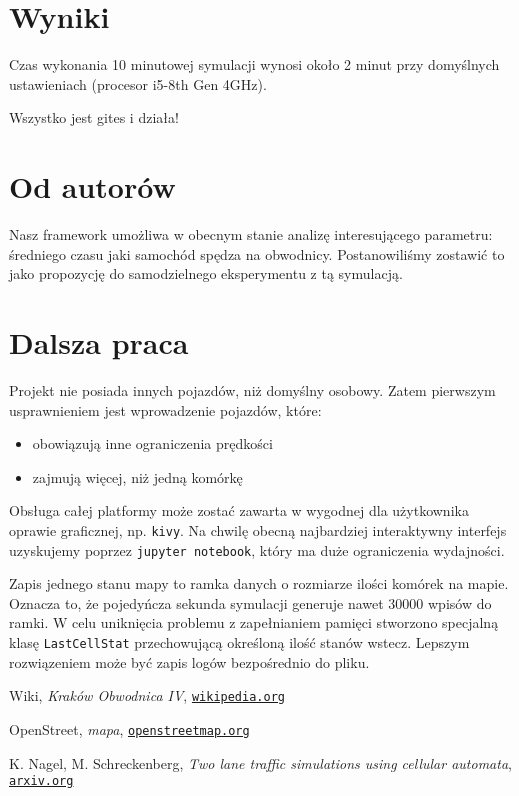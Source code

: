 \documentclass[a4paper,12pt]{article}
\begin{document}
    \section{Wyniki}
    Czas wykonania 10 minutowej symulacji wynosi około 2 minut przy domyślnych ustawieniach (procesor i5-8th Gen 4GHz).
    
	Wszystko jest gites i działa!
		
    \section{Od autorów}
    Nasz framework umożliwa w obecnym stanie analizę interesującego parametru: średniego czasu jaki samochód spędza na obwodnicy. Postanowiliśmy zostawić to jako propozycję do samodzielnego eksperymentu z tą symulacją.

    \section{Dalsza praca}
    Projekt nie posiada innych pojazdów, niż domyślny osobowy. Zatem pierwszym usprawnieniem jest wprowadzenie pojazdów, które: 
    
    \begin{itemize}
    	\item obowiązują inne ograniczenia prędkości
    	\item zajmują więcej, niż jedną komórkę
    \end{itemize}

	Obsługa całej platformy może zostać zawarta w wygodnej dla użytkownika oprawie graficznej, np. \texttt{kivy}. Na chwilę obecną najbardziej interaktywny interfejs uzyskujemy poprzez \texttt{jupyter notebook}, który ma duże ograniczenia wydajności.
	
	Zapis jednego stanu mapy to ramka danych o rozmiarze ilości komórek na mapie. Oznacza to, że pojedyńcza sekunda symulacji generuje nawet 30000 wpisów do ramki. W celu uniknięcia problemu z zapełnianiem pamięci stworzono specjalną klasę \texttt{LastCellStat} przechowującą określoną ilość stanów wstecz.
	Lepszym rozwiązeniem może być zapis logów bezpośrednio do pliku.

	\pagebreak
	\begin{thebibliography}{15}
		Wiki, \textit{Kraków Obwodnica IV},
		\texttt{\href{https://pl.wikipedia.org/wiki/Obwodnice_Krakowa\#IV_obwodnica}{wikipedia.org}}
		
		OpenStreet, \textit{mapa},
		\texttt{\href{https://www.openstreetmap.org/}{openstreetmap.org}}
		
		K. Nagel, M. Schreckenberg, \textit{Two lane traffic simulations using cellular automata},
		\texttt{\href{https://arxiv.org/pdf/cond-mat/9512119.pdf}{arxiv.org}}
	\end{thebibliography}
	
\end{document}
